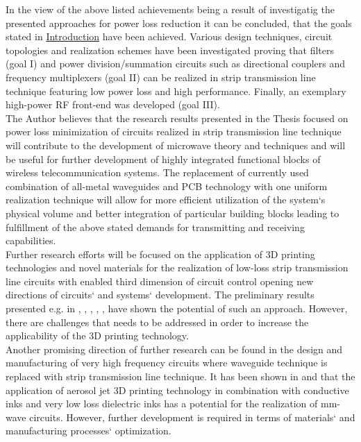 \indent In the view of the above listed achievements being a result of investigatig the presented approaches for power loss reduction it can be concluded, that the goals stated in \hyperref[intro:goal]{Introduction} have been achieved. Various design techniques, circuit topologies and realization schemes have been investigated proving that filters (goal I) and power division/summation circuits such as directional couplers and frequency multiplexers (goal II) can be realized in strip transmission line technique featuring low power loss and high performance. Finally, an exemplary high-power RF front-end was developed (goal III).
\\
\indent The Author believes that the research results presented in the Thesis focused on power loss minimization of circuits realized in strip transmission line technique will contribute to the development of microwave theory and techniques and will be useful for further development of highly integrated functional blocks of wireless telecommunication systems. The replacement of currently used combination of all-metal waveguides and PCB technology with one uniform realization technique will allow for more efficient utilization of the system`s physical volume and better integration of particular building blocks leading to fulfillment of the above stated demands for transmitting and receiving capabilities.
\\
\indent Further research efforts will be focused on the application of 3D printing technologies and novel materials for the realization of low-loss strip transmission line circuits with enabled third dimension of circuit control opening new directions of circuits` and systems` development. The preliminary results presented e.g. in \cite{iceese_3D_graphene}, \cite{ectc_electrify}, \cite{ectc_df}, \cite{polyjet_susp_coupler}, \cite{apwc_absorber}, \cite{iceaa_magnetic} have shown the potential of such an approach. However, there are challenges that needs to be addressed in order to increase the applicability of the 3D printing technology.
\\
\indent Another promising direction of further research can be found in the design and manufacturing of very high frequency circuits where waveguide technique is replaced with strip transmission line technique. It has been shown in \cite{tmtt_aerosol} and \cite{eumw_aerosol} that the application of aerosol jet 3D printing technology in combination with conductive inks and very low loss dielectric inks has a potential for the realization of mm-wave circuits. However, further development is required in terms of materials` and manufacturing processes` optimization.

\cleardoublepage